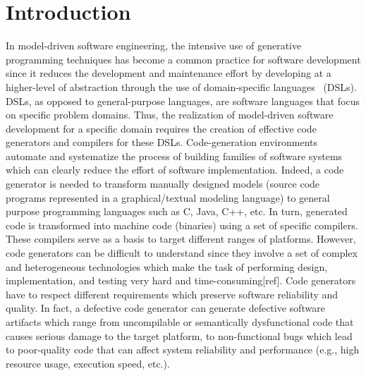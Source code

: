 \section{Introduction}
In model-driven software engineering, the intensive use of generative programming techniques has become a common practice for software development since it reduces the development and maintenance effort by developing at a higher-level of abstraction through the use of domain-specific languages~\cite{brambilla2012model} (DSLs). 
DSLs, as opposed to general-purpose languages, are software languages that focus on specific problem domains. Thus, the realization of model-driven software development for a specific domain requires the creation of effective code generators and compilers for these DSLs.
Code-generation environments automate and systematize the process of building families of software systems which can clearly reduce the effort of software implementation.
Indeed, a code generator is needed to transform manually designed models (source code programs represented in a graphical/textual modeling language) to general purpose programming languages such as C, Java, C++, etc. In turn, generated code is transformed into machine code (binaries) using a set of specific compilers.
These compilers serve as a basis to target different ranges of platforms. 
However, code generators can be difficult to understand since they involve a set of complex and heterogeneous technologies which make the task of performing design, implementation, and testing very hard and time-consuming[ref]. Code generators have to respect different requirements which preserve software reliability and quality. In fact, a defective code generator can generate defective software artifacts which range from uncompilable or semantically dysfunctional code that causes serious damage to the target platform, to non-functional bugs which lead to poor-quality code that can affect system reliability and performance (e.g., high resource usage, execution speed, etc.). 

